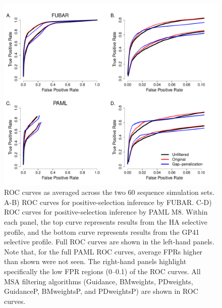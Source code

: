\documentclass[11pt]{article}
\begin{document}
\begin{figure}[H]
\centerline{\includegraphics[width=6in]{Figures/ROC_prk.pdf}}
\caption{\label{roc} ROC curves as averaged across the two 60 sequence simulation sets. A-B) ROC curves for positive-selection inference by FUBAR. C-D) ROC curves for positive-selection inference by PAML M8. Within each panel, the top curve represents results from the HA selective profile, and the bottom curve represents results from the GP41 selective profile. Full ROC curves are shown in the left-hand panels. Note that, for the full PAML ROC curves, average FPRs higher than shown were not seen. The right-hand panels highlight specifically the low FPR regions (0--0.1) of the ROC curves. All MSA filtering algorithms (Guidance, BMweights, PDweights, GuidanceP, BMweightsP, and PDweightsP) are shown in ROC curves. }
\end{figure}
\end{document}
